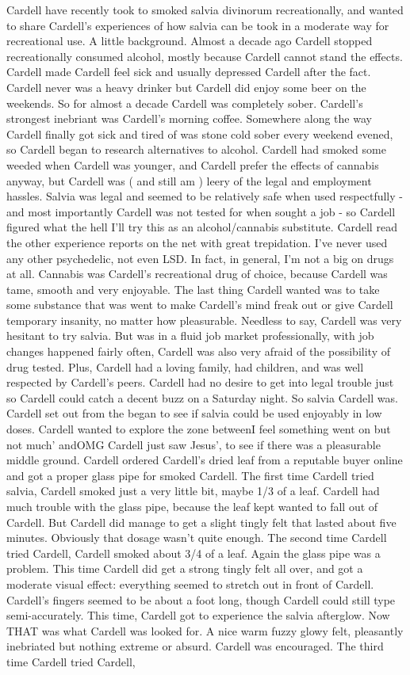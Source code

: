 \documentclass[12pt]{book}
\begin{document}
Cardell have recently took to smoked salvia divinorum recreationally, and wanted to share Cardell's experiences of how salvia can be took in a moderate way for recreational use. A little background. Almost a decade ago Cardell stopped recreationally consumed alcohol, mostly because Cardell cannot stand the effects. Cardell made Cardell feel sick and usually depressed Cardell after the fact. Cardell never was a heavy drinker but Cardell did enjoy some beer on the weekends. So for almost a decade Cardell was completely sober. Cardell's strongest inebriant was Cardell's morning coffee. Somewhere along the way Cardell finally got sick and tired of was stone cold sober every weekend evened, so Cardell began to research alternatives to alcohol. Cardell had smoked some weeded when Cardell was younger, and Cardell prefer the effects of cannabis anyway, but Cardell was ( and still am ) leery of the legal and employment hassles. Salvia was legal and seemed to be relatively safe when used respectfully - and most importantly Cardell was not tested for when sought a job - so Cardell figured what the hell I'll try this as an alcohol/cannabis substitute. Cardell read the other experience reports on the net with great trepidation. I've never used any other psychedelic, not even LSD. In fact, in general, I'm not a big on drugs at all. Cannabis was Cardell's recreational drug of choice, because Cardell was tame, smooth and very enjoyable. The last thing Cardell wanted was to take some substance that was went to make Cardell's mind freak out or give Cardell temporary insanity, no matter how pleasurable. Needless to say, Cardell was very hesitant to try salvia. But was in a fluid job market professionally, with job changes happened fairly often, Cardell was also very afraid of the possibility of drug tested. Plus, Cardell had a loving family, had children, and was well respected by Cardell's peers. Cardell had no desire to get into legal trouble just so Cardell could catch a decent buzz on a Saturday night. So salvia Cardell was. Cardell set out from the began to see if salvia could be used enjoyably in low doses. Cardell wanted to explore the zone betweenI feel something went on but not much' andOMG Cardell just saw Jesus', to see if there was a pleasurable middle ground. Cardell ordered Cardell's dried leaf from a reputable buyer online and got a proper glass pipe for smoked Cardell. The first time Cardell tried salvia, Cardell smoked just a very little bit, maybe 1/3 of a leaf. Cardell had much trouble with the glass pipe, because the leaf kept wanted to fall out of Cardell. But Cardell did manage to get a slight tingly felt that lasted about five minutes. Obviously that dosage wasn't quite enough. The second time Cardell tried Cardell, Cardell smoked about 3/4 of a leaf. Again the glass pipe was a problem. This time Cardell did get a strong tingly felt all over, and got a moderate visual effect: everything seemed to stretch out in front of Cardell. Cardell's fingers seemed to be about a foot long, though Cardell could still type semi-accurately. This time, Cardell got to experience the salvia afterglow. Now THAT was what Cardell was looked for. A nice warm fuzzy glowy felt, pleasantly inebriated but nothing extreme or absurd. Cardell was encouraged. The third time Cardell tried Cardell, 
\end{document}
